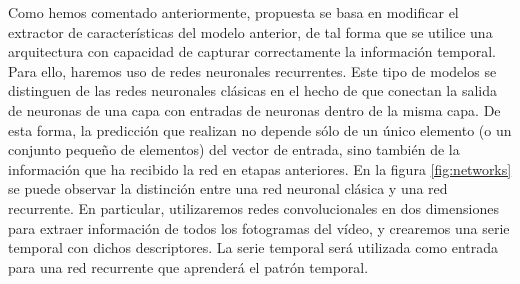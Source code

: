\documentclass[../main.tex]{memoir}
\begin{document}
Como hemos comentado anteriormente, propuesta se basa en modificar el
extractor de características del modelo anterior, de tal forma que se
utilice una arquitectura con capacidad de capturar correctamente la
información temporal. Para ello, haremos uso de redes neuronales
recurrentes. Este tipo de modelos se distinguen de las redes
neuronales clásicas en el hecho de que conectan la salida de neuronas
de una capa con entradas de neuronas dentro de la misma capa. De esta
forma, la predicción que realizan no depende sólo de un único elemento
(o un conjunto pequeño de elementos) del vector de entrada, sino
también de la información que ha recibido la red en etapas
anteriores. En la figura \ref{fig:networks} se puede observar la
distinción entre una red neuronal clásica y una red recurrente. En
particular, utilizaremos redes convolucionales en dos dimensiones para
extraer información de todos los fotogramas del vídeo, y crearemos una
serie temporal con dichos descriptores. La serie temporal será
utilizada como entrada para una red recurrente que aprenderá el patrón
temporal.\\
\end{document}
